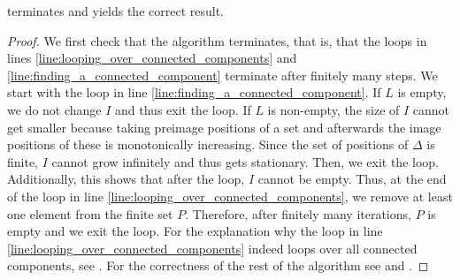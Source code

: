 \begin{prop}
 terminates and yields the correct result.
\end{prop}
\begin{proof}
We first check that the algorithm terminates, that is, that the loops in lines \ref{line:looping_over_connected_components} and \ref{line:finding_a_connected_component} terminate after finitely many steps. We start with the loop in line \ref{line:finding_a_connected_component}. If $L$ is empty, we do not change $I$ and thus exit the loop. If $L$ is non-empty, the size of $I$ cannot get smaller because taking preimage positions of a set and afterwards the image positions of these is monotonically increasing. Since the set of positions of $\Delta$ is finite, $I$ cannot grow infinitely and thus gets stationary. Then, we exit the loop. Additionally, this shows that after the loop, $I$ cannot be empty. Thus, at the end of the loop in line \ref{line:looping_over_connected_components}, we remove at least one element from the finite set $P$. Therefore, after finitely many iterations, $P$ is empty and we exit the loop.
For the explanation why the loop in line \ref{line:looping_over_connected_components} indeed loops over all connected components, see . For the correctness of the rest of the algorithm see  and .
\end{proof}
